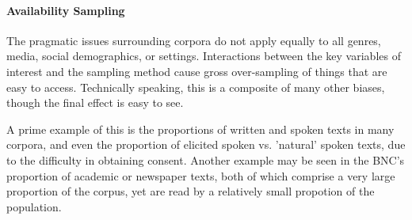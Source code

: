 




\paragraph{Availability Sampling}
The pragmatic issues surrounding corpora do not apply equally to all genres, media, social demographics, or settings.  Interactions between the key variables of interest and the sampling method cause gross over-sampling of things that are easy to access.  Technically speaking, this is a composite of many other biases, though the final effect is easy to see.

A prime example of this is the proportions of written and spoken texts in many corpora, and even the proportion of elicited spoken vs. 'natural' spoken texts, due to the difficulty in obtaining consent.  Another example may be seen in the BNC's proportion of academic or newspaper texts, both of which comprise a very large proportion of the corpus, yet are read by a relatively small propotion of the population.


